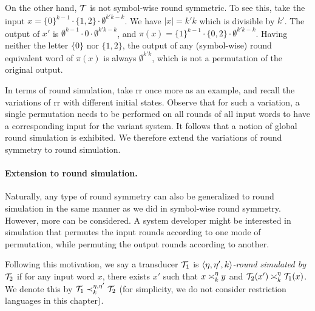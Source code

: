 \begin{example}
On the other hand, $\cT$ is not symbol-wise round symmetric. To see this, take the input $x=\{0\}^{k-1}\cdot\{1,2\}\cdot\emptyset^{k'k-k}$. We have $|x|=k'k$ which is divisible by $k'$. The output of $x'$ is $\emptyset^{k-1}\cdot0\cdot\emptyset^{k'k-k}$, and $\pi(x)=\{1\}^{k-1}\cdot\{0,2\}\cdot\emptyset^{k'k-k}$. Having neither the letter $\{0\}$ nor $\{1,2\}$, the output of any (symbol-wise) round equivalent word of $\pi(x)$ is always $\emptyset^{k'k}$, which is not a permutation of the original output.

\end{example}

In terms of round simulation, take \gls{rr} once more as an example, and recall the variations of \gls{rr} with different initial states. Observe that for such a variation, a single permutation needs to be performed on all rounds of all input words to have a corresponding input for the variant system. It follows that a notion of global round simulation is exhibited. We therefore extend the variations of round symmetry to round simulation.

\paragraph*{Extension to round simulation.}
Naturally, any type of round symmetry can also be generalized to round simulation in the same manner as we did in symbol-wise round symmetry. However, more can be considered. A system developer might be interested in simulation that permutes the input rounds according to one mode of permutation, while permuting the output rounds according to another.

Following this motivation, we say a transducer $\cT_1$ is \emph{$\tup{\eta, \eta', k}$-round simulated by $\cT_2$} if for any input word $x$, there exists $x'$ such that $x\req[k]^\eta y$ and $\cT_2(x')\req[k]^\eta \cT_1(x)$. We denote this by $\cT_1 \prec_{k}^{\eta,\eta'} \cT_2$ (for simplicity, we do not consider restriction languages in this chapter).

